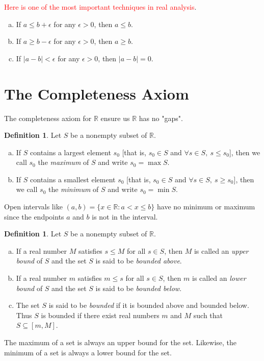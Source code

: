 \documentclass[12pt, lettersize]{book}
\theoremstyle{plain}
\theoremstyle{definition}
\newtheorem{dfn}[thm]{Definition}
\theoremstyle{remark}
\newcommand{\R}{\mathbb{R}}
\begin{document}
	\begin{tcolorbox}
		\textcolor{red}{Here is one of the most important techniques in real analysis}.
		\begin{enumerate}[(a)]
			\item If $a\leq b+\epsilon$ for any $\epsilon>0$, then $a\leq b$.
			\item If $a\geq b-\epsilon$ for any $\epsilon>0$, then $a\geq b$.
			\item If $|a-b|<\epsilon$ for any $\epsilon>0$, then $|a-b|=0$.
		\end{enumerate}
	\end{tcolorbox}
	
	\newpage
	\section{The Completeness Axiom}
	The completeness axiom for $\R$ ensure us $\R$ has no "gaps".
	\begin{dfn}\label{def:4.1}
		Let $S$ be a nonempty subset of $\R$.
		\begin{enumerate}[(a)]
			\item If $S$ contains a largest element $s_0$ [that is, $s_0\in S$ and $\forall s\in S,\ s\leq s_0$], then we call $s_0$ the \emph{maximum} of $S$ and write $s_0=\max S$.
			\item If $S$ contains a smallest element $s_0$ [that is, $s_0\in S$ and $\forall s\in S,\ s\geq s_0$], then we call $s_0$ the \emph{minimum} of $S$ and write $s_0=\min S$. 
		\end{enumerate}
	\end{dfn}
	Open intervals like $(a,b)=\{x\in\R: a<x\leq b\}$ have no minimum or maximum since the endpoints $a$ and $b$ is not in the interval.
	
	\begin{dfn}\label{def:4.2}
		Let $S$ be a nonempty subset of $\R$.
		\begin{enumerate}[(a)]
			\item If a real number $M$ satisfies $s\leq M$ for all $s\in S$, then $M$ is called an \emph{upper bound} of $S$ and the set $S$ is said to be \emph{bounded above}.
			\item If a real number $m$ satisfies $m\leq s$ for all $s\in S$, then $m$ is called an \emph{lower bound} of $S$ and the set $S$ is said to be \emph{bounded below}.
			\item The set $S$ is said to be \emph{bounded} if it is bounded above and bounded below. Thus $S$ is bounded if there exist real numbers $m$ and $M$ such that $S\subseteq[m,M]$.
		\end{enumerate}
	\end{dfn}
	The maximum of a set is always an upper bound for the set. Likewise, the minimum of a set is always a lower bound for the set.
	
\end{document}
